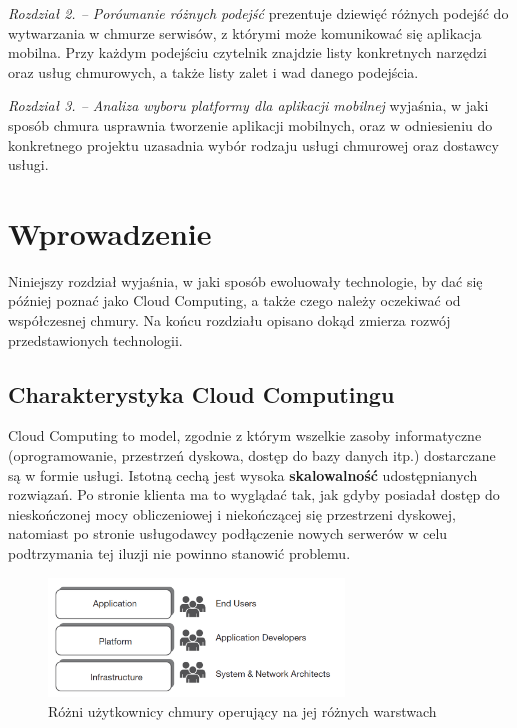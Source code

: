 \documentclass[12pt,a4paper,twoside,titlepage,openright]{book}
\begin{document}
\noindent
\textit{Rozdział 2. -- Porównanie różnych podejść} prezentuje dziewięć różnych podejść do wytwarzania w chmurze serwisów, z którymi może komunikować się aplikacja mobilna. Przy każdym podejściu czytelnik znajdzie listy konkretnych narzędzi oraz usług chmurowych, a także listy zalet i wad danego podejścia.

\noindent
\textit{Rozdział 3. -- Analiza wyboru platformy dla aplikacji mobilnej} wyjaśnia, w jaki sposób chmura usprawnia tworzenie aplikacji mobilnych, oraz w odniesieniu do konkretnego projektu uzasadnia wybór rodzaju usługi chmurowej oraz dostawcy usługi.


\clearpage{\pagestyle{empty}\cleardoublepage}
\chapter{Wprowadzenie}

Niniejszy rozdział wyjaśnia, w jaki sposób ewoluowały technologie, by dać się później poznać jako Cloud Computing, a także czego należy oczekiwać od współczesnej chmury. Na końcu rozdziału opisano dokąd zmierza rozwój przedstawionych technologii.



\section{Charakterystyka Cloud Computingu}

Cloud Computing to model, zgodnie z którym wszelkie zasoby informatyczne (oprogramowanie, przestrzeń dyskowa, dostęp do bazy danych itp.) dostarczane są w formie usługi. Istotną cechą jest wysoka \textbf{skalowalność} udostępnianych rozwiązań. Po stronie klienta ma to wyglądać tak, jak gdyby posiadał dostęp do nieskończonej mocy obliczeniowej i niekończącej się przestrzeni dyskowej, natomiast po stronie usługodawcy podłączenie nowych serwerów w celu podtrzymania tej iluzji nie powinno stanowić problemu. \cite{ccBiznes}

\begin{figure}[h]
	\centering
			\includegraphics[width=0.7\textwidth]{layers-and-users.png}
		\caption{Różni użytkownicy chmury operujący na jej różnych warstwach \cite{ccCambridge}}
		\label{fig:layers-and-users}
\end{figure}
\end{document}
